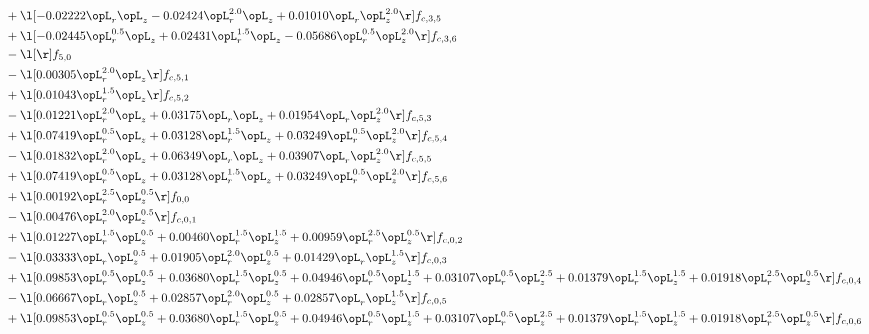 \begin{alignat}{2}
& + \l[  -0.02222 \opL_r \opL_z   -0.02424 \opL_r^{2.0} \opL_z +  0.01010 \opL_r \opL_z^{2.0}  \r] f_{c,3,5} \nonumber \\ 
& + \l[  -0.02445 \opL_r^{0.5} \opL_z +  0.02431 \opL_r^{1.5} \opL_z   -0.05686 \opL_r^{0.5} \opL_z^{2.0}  \r] f_{c,3,6} \nonumber \\ 
& - \l[  \r] f_{5,0} \nonumber \\ 
& - \l[  0.00305 \opL_r^{2.0} \opL_z  \r] f_{c,5,1} \nonumber \\ 
& + \l[  0.01043 \opL_r^{1.5} \opL_z  \r] f_{c,5,2} \nonumber \\ 
& - \l[  0.01221 \opL_r^{2.0} \opL_z +  0.03175 \opL_r \opL_z +  0.01954 \opL_r \opL_z^{2.0}  \r] f_{c,5,3} \nonumber \\ 
& + \l[  0.07419 \opL_r^{0.5} \opL_z +  0.03128 \opL_r^{1.5} \opL_z +  0.03249 \opL_r^{0.5} \opL_z^{2.0}  \r] f_{c,5,4} \nonumber \\ 
& - \l[  0.01832 \opL_r^{2.0} \opL_z +  0.06349 \opL_r \opL_z +  0.03907 \opL_r \opL_z^{2.0}  \r] f_{c,5,5} \nonumber \\ 
& + \l[  0.07419 \opL_r^{0.5} \opL_z +  0.03128 \opL_r^{1.5} \opL_z +  0.03249 \opL_r^{0.5} \opL_z^{2.0}  \r] f_{c,5,6} \nonumber \\ 
& + \l[  0.00192 \opL_r^{2.5} \opL_z^{0.5}  \r] f_{0,0} \nonumber \\ 
& - \l[  0.00476 \opL_r^{2.0} \opL_z^{0.5}  \r] f_{c,0,1} \nonumber \\ 
& + \l[  0.01227 \opL_r^{1.5} \opL_z^{0.5} +  0.00460 \opL_r^{1.5} \opL_z^{1.5} +  0.00959 \opL_r^{2.5} \opL_z^{0.5}  \r] f_{c,0,2} \nonumber \\ 
& - \l[  0.03333 \opL_r \opL_z^{0.5} +  0.01905 \opL_r^{2.0} \opL_z^{0.5} +  0.01429 \opL_r \opL_z^{1.5}  \r] f_{c,0,3} \nonumber \\ 
& + \l[  0.09853 \opL_r^{0.5} \opL_z^{0.5} +  0.03680 \opL_r^{1.5} \opL_z^{0.5} +  0.04946 \opL_r^{0.5} \opL_z^{1.5} +  0.03107 \opL_r^{0.5} \opL_z^{2.5} +  0.01379 \opL_r^{1.5} \opL_z^{1.5} +  0.01918 \opL_r^{2.5} \opL_z^{0.5}  \r] f_{c,0,4} \nonumber \\ 
& - \l[  0.06667 \opL_r \opL_z^{0.5} +  0.02857 \opL_r^{2.0} \opL_z^{0.5} +  0.02857 \opL_r \opL_z^{1.5}  \r] f_{c,0,5} \nonumber \\ 
& + \l[  0.09853 \opL_r^{0.5} \opL_z^{0.5} +  0.03680 \opL_r^{1.5} \opL_z^{0.5} +  0.04946 \opL_r^{0.5} \opL_z^{1.5} +  0.03107 \opL_r^{0.5} \opL_z^{2.5} +  0.01379 \opL_r^{1.5} \opL_z^{1.5} +  0.01918 \opL_r^{2.5} \opL_z^{0.5}  \r] f_{c,0,6} \nonumber \\ 

\end{alignat}
